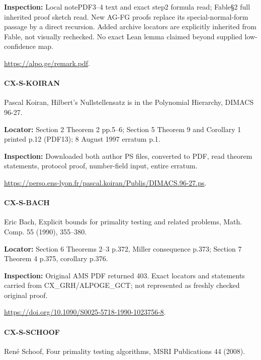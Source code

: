 \documentclass[11pt,a4paper]{article}
\begin{document}
\textbf{Inspection:} Local notePDF3–\allowbreak{}4 text and exact step2 formula read; Fable§2 full inherited proof sketch read.\allowbreak{} New AG-FG proofs replace its special-normal-form passage by a direct recursion.\allowbreak{} Added archive locators are explicitly inherited from Fable, not visually rechecked.\allowbreak{} No exact Lean lemma claimed beyond supplied low-confidence map.\allowbreak{}

\url{https://alpo.ge/remark.pdf}.

\paragraph{CX-S-KOIRAN} Pascal Koiran, Hilbert’s Nullstellensatz is in the Polynomial Hierarchy, DIMACS 96-27.

\textbf{Locator:} Section 2 Theorem 2 pp.\allowbreak{}5–\allowbreak{}6; Section 5 Theorem 9 and Corollary 1 printed p.\allowbreak{}12 (PDF13); 8 August 1997 erratum p.\allowbreak{}1.

\textbf{Inspection:} Downloaded both author PS files, converted to PDF, read theorem statements, protocol proof, number-field input, entire erratum.\allowbreak{}

\url{https://perso.ens-lyon.fr/pascal.koiran/Publis/DIMACS.96-27.ps}.

\paragraph{CX-S-BACH} Eric Bach, Explicit bounds for primality testing and related problems, Math.\allowbreak{} Comp.\allowbreak{} 55 (1990), 355–\allowbreak{}380.

\textbf{Locator:} Section 6 Theorems 2–\allowbreak{}3 p.\allowbreak{}372, Miller consequence p.\allowbreak{}373; Section 7 Theorem 4 p.\allowbreak{}375, corollary p.\allowbreak{}376.

\textbf{Inspection:} Original AMS PDF returned 403.\allowbreak{} Exact locators and statements carried from CX\_\allowbreak{}GRH/\allowbreak{}ALPOGE\_\allowbreak{}GCT; not represented as freshly checked original proof.\allowbreak{}

\url{https://doi.org/10.1090/S0025-5718-1990-1023756-8}.

\paragraph{CX-S-SCHOOF} René Schoof, Four primality testing algorithms, MSRI Publications 44 (2008).
\end{document}
